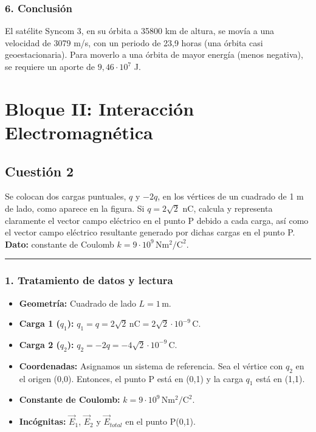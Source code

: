 \subsubsection*{6. Conclusión}
\begin{cajaconclusion}
El satélite Syncom 3, en su órbita a 35800 km de altura, se movía a una velocidad de 3079 m/s, con un periodo de 23,9 horas (una órbita casi geoestacionaria). Para moverlo a una órbita de mayor energía (menos negativa), se requiere un aporte de $9,46 \cdot 10^7$ J.
\end{cajaconclusion}

\newpage
\section{Bloque II: Interacción Electromagnética}
\label{sec:em_2020_jul_ext}

\subsection{Cuestión 2}
\label{subsec:C2_2020_jul_ext_b}

\begin{cajaenunciado}
Se colocan dos cargas puntuales, $q$ y $-2q$, en los vértices de un cuadrado de 1 m de lado, como aparece en la figura. Si $q=2\sqrt{2}$ nC, calcula y representa claramente el vector campo eléctrico en el punto P debido a cada carga, así como el vector campo eléctrico resultante generado por dichas cargas en el punto P.
\textbf{Dato:} constante de Coulomb $k=9\cdot10^{9}\,\text{N}\text{m}^2/\text{C}^2$.
\end{cajaenunciado}
\hrule

\subsubsection*{1. Tratamiento de datos y lectura}
\begin{itemize}
    \item \textbf{Geometría:} Cuadrado de lado $L=1 \, \text{m}$.
    \item \textbf{Carga 1 ($q_1$):} $q_1 = q = 2\sqrt{2} \, \text{nC} = 2\sqrt{2} \cdot 10^{-9} \, \text{C}$.
    \item \textbf{Carga 2 ($q_2$):} $q_2 = -2q = -4\sqrt{2} \cdot 10^{-9} \, \text{C}$.
    \item \textbf{Coordenadas:} Asignamos un sistema de referencia. Sea el vértice con $q_2$ en el origen (0,0). Entonces, el punto P está en (0,1) y la carga $q_1$ está en (1,1).
    \item \textbf{Constante de Coulomb:} $k = 9 \cdot 10^9 \, \text{N}\text{m}^2/\text{C}^2$.
    \item \textbf{Incógnitas:} $\vec{E}_1$, $\vec{E}_2$ y $\vec{E}_{total}$ en el punto P(0,1).
\end{itemize}

